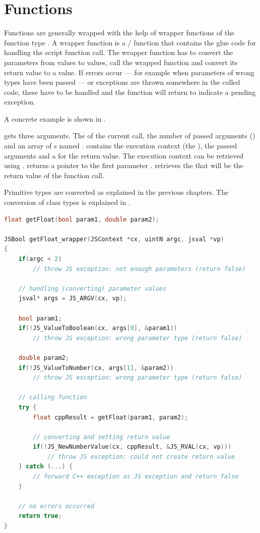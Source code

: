 \section{Functions}
\label{sec:Functions}

Functions are generally wrapped with the help of wrapper functions of the function type . A wrapper function is a / function that contains the glue code for handling the script function call. The wrapper function has to convert the parameters from  values to  values, call the wrapped function and convert its return value to a  value. If errors occur --- for example when parameters of wrong types have been passed --- or exceptions are thrown somewhere in the called  code, these have to be handled and the function will return  to indicate a pending  exception.

A concrete example is shown in .

 gets three arguments. The  of the current call, the number of passed arguments () and an array of s named .  contains the execution context (the ), the passed arguments and a  for the return value. The execution context can be retrieved using .  returns a pointer to the first parameter .  retrieves the  that will be the return value of the function call.

Primitive types are converted as explained in the previous chapters. The conversion of class types is explained in .

\newpage
\SingleSpacing
\begin{lstlisting}[language=C++, caption=A simple wrapper function, label=lst:WrappingFunctions]
float getFloat(bool param1, double param2);

JSBool getFloat_wrapper(JSContext *cx, uintN argc, jsval *vp)
{
	if(argc < 2)
		// throw JS exception: not enough parameters (return false)

	// handling (converting) parameter values
	jsval* args = JS_ARGV(cx, vp);

	bool param1;
	if(!JS_ValueToBoolean(cx, args[0], &param1))
		// throw JS exception: wrong parameter type (return false)
	
	double param2;
	if(!JS_ValueToNumber(cx, args[1], &param2))
		// throw JS exception: wrong parameter type (return false)

	// calling function
	try {	
		float cppResult = getFloat(param1, param2);
		
		// converting and setting return value
		if(!JS_NewNumberValue(cx, cppResult, &JS_RVAL(cx, vp)))
			// throw JS exception: could not create return value
	} catch (...) {
		// forward C++ exception as JS exception and return false
	}

	// no errors occurred
	return true;
}
\end{lstlisting}
\OnehalfSpacing

